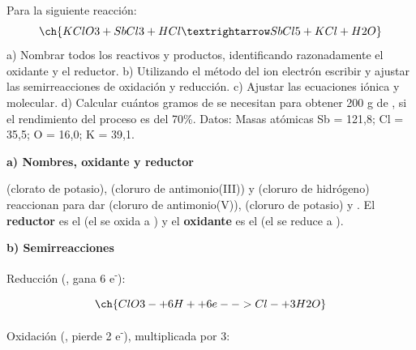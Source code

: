 \begin{exerciseEVAU}
    Para la siguiente reacción:
    \begin{equation*}
        \ch{KClO3 + SbCl3 + HCl → SbCl5 + KCl + H2O}
    \end{equation*}
    a) Nombrar todos los reactivos y productos, identificando razonadamente el oxidante y el reductor. b) Utilizando el método del ion electrón escribir y ajustar las semirreacciones de oxidación y reducción. c) Ajustar las ecuaciones iónica y molecular. d) Calcular cuántos gramos de  se necesitan para obtener 200 g de , si el rendimiento del proceso es del 70\%. Datos: Masas atómicas Sb = 121,8; Cl = 35,5; O = 16,0; K = 39,1.

    \begin{solu}


        \textbf{a) Nombres, oxidante y reductor}

         (clorato de potasio),  (cloruro de antimonio(III)) y  (cloruro de hidrógeno) reaccionan para dar  (cloruro de antimonio(V)),  (cloruro de potasio) y . El \textbf{reductor} es el  (el  se oxida a ) y el \textbf{oxidante} es el  (el  se reduce a ).

        \textbf{b) Semirreacciones}

        Reducción (, gana 6 e\textsuperscript{-}):

        \begin{equation*}
            \ch{ClO3- + 6 H+ + 6 e- -> Cl- + 3 H2O}
        \end{equation*}

        Oxidación (, pierde 2 e\textsuperscript{-}), multiplicada por 3:


\end{solu}
\end{exerciseEVAU}
